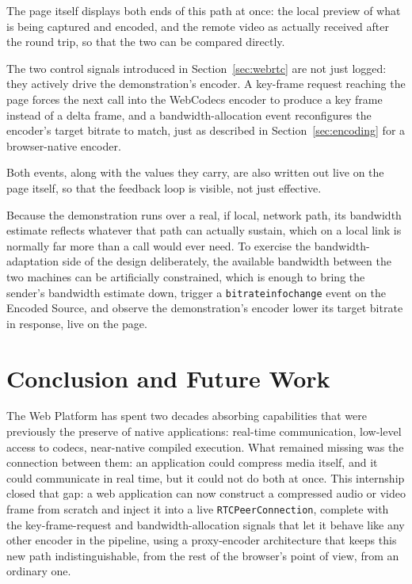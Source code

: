 \documentclass[11pt]{article}
\begin{document}
The page itself displays both ends of this path at once: the local preview of what is being captured and encoded, and the remote video as actually received after the round trip, so that the two can be compared directly.

The two control signals introduced in Section~\ref{sec:webrtc} are not just logged: they actively drive the demonstration's encoder. A key-frame request reaching the page forces the next call into the WebCodecs encoder to produce a key frame instead of a delta frame, and a bandwidth-allocation event reconfigures the encoder's target bitrate to match, just as described in Section~\ref{sec:encoding} for a browser-native encoder.

Both events, along with the values they carry, are also written out live on the page itself, so that the feedback loop is visible, not just effective.

Because the demonstration runs over a real, if local, network path, its bandwidth estimate reflects whatever that path can actually sustain, which on a local link is normally far more than a call would ever need. To exercise the bandwidth-adaptation side of the design deliberately, the available bandwidth between the two machines can be artificially constrained, which is enough to bring the sender's bandwidth estimate down, trigger a \texttt{bitrateinfochange} event on the Encoded Source, and observe the demonstration's encoder lower its target bitrate in response, live on the page.

\section{Conclusion and Future Work}
\label{sec:conclusion}

The Web Platform has spent two decades absorbing capabilities that were previously the preserve of native applications: real-time communication, low-level access to codecs, near-native compiled execution. What remained missing was the connection between them: an application could compress media itself, and it could communicate in real time, but it could not do both at once. This internship closed that gap: a web application can now construct a compressed audio or video frame from scratch and inject it into a live \texttt{RTCPeerConnection}, complete with the key-frame-request and bandwidth-allocation signals that let it behave like any other encoder in the pipeline, using a proxy-encoder architecture that keeps this new path indistinguishable, from the rest of the browser's point of view, from an ordinary one.
\end{document}
